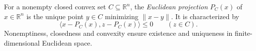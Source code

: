 
For a nonempty closed convex set $C\subseteq\mathbb R^n$, the \emph{Euclidean projection} $P_C(x)$ of $x\in\mathbb R^n$ is the unique point $y\in C$ minimizing $\|x-y\|$. It is characterized by
\[
\langle x-P_C(x),z-P_C(x)\rangle\le0\qquad(z\in C).
\]
Nonemptiness, closedness and convexity ensure existence and uniqueness in finite-dimensional Euclidean space.

